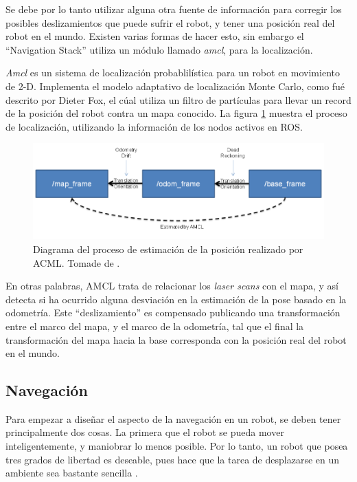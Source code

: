 Se debe por lo tanto utilizar alguna otra fuente de información para corregir los posibles deslizamientos que puede sufrir el robot, y tener una posición real del robot en el mundo. Existen varias formas de hacer esto, sin embargo el ``Navigation Stack'' utiliza un módulo llamado \textit{amcl}, para la localización.

\textit{Amcl} es un sistema de localización probablilística para un robot en movimiento de 2-D. Implementa el modelo adaptativo de localización Monte Carlo, como fué descrito por Dieter Fox, el cúal utiliza un filtro de partículas para llevar un record de la posición del robot contra un mapa conocido. La figura \ref{F:amcl} muestra el proceso de localización, utilizando la información de los nodos activos en ROS.

\begin{figure}[H]
\centering
\includegraphics[scale=0.4]{imagenes/mapa_amcl.png}
\caption{Diagrama del proceso de estimación de la posición realizado por ACML. Tomade de \cite{ROSAMCL}.}
\label{F:amcl}
\end{figure}

En otras palabras, AMCL trata de relacionar los \textit{laser scans} con el mapa, y así detecta si ha ocurrido alguna desviación  en la estimación de la pose basado en la odometría. Este ``deslizamiento'' es compensado publicando una transformación entre el marco del mapa, y el marco de la odometría, tal que el final la transformación del mapa hacia la base corresponda con la posición real del robot en el mundo.


\subsection{Navegación}

Para empezar a diseñar el aspecto de la navegación en un robot, se deben tener principalmente dos cosas. La primera que el robot se pueda mover inteligentemente, y maniobrar lo menos posible. Por lo tanto, un robot que posea tres grados de libertad es deseable, pues hace que la tarea de desplazarse en un ambiente sea bastante sencilla \cite{Batlle2009}.

